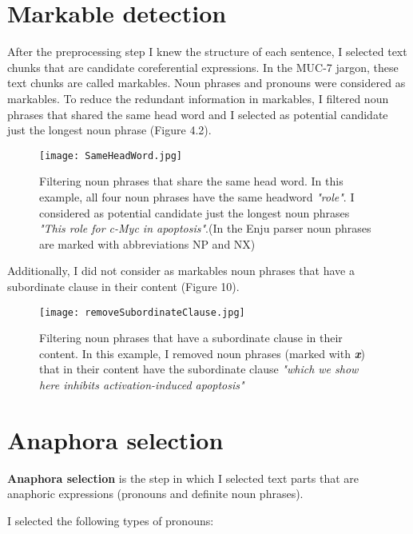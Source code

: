 \section{Markable detection}

After the preprocessing step I knew the structure of each sentence, I selected text chunks that are candidate coreferential expressions. In the MUC-7 jargon, these text chunks are called markables. Noun phrases and pronouns were considered as markables. To reduce the redundant information in markables, I filtered noun phrases that shared the same head word and I selected as potential candidate just the longest noun phrase (Figure 4.2). 

\begin{figure}[h]
	\begin{center}
		\texttt{[image: SameHeadWord.jpg]} 
 		\caption{ Filtering noun phrases that share the same head word. In this example, all four noun phrases have the same headword \emph{"role"}. I considered as potential candidate just the longest noun phrases \emph{"This role for c-Myc in apoptosis"}.(In the Enju parser noun phrases are marked with abbreviations NP and NX) }
		\label{Figure 9}
	\end{center}
\end{figure}

Additionally, I did not consider as markables noun phrases that have a subordinate clause in their content (Figure 10).

\begin{figure}[h]
	\begin{center}
		\texttt{[image: removeSubordinateClause.jpg]} 
 		\caption{ Filtering noun phrases that have a subordinate clause in their content. In this example, I removed noun phrases (marked with \emph{\textbf{x}}) that in their content have the subordinate clause  \emph{"which we show here inhibits activation-induced apoptosis"} }
		\label{Figure 10}
	\end{center}
\end{figure}

\section{Anaphora selection}

\textbf{Anaphora selection} is the step in which I selected text parts that are anaphoric expressions (pronouns and definite noun phrases).
 
I selected the following types of pronouns:

